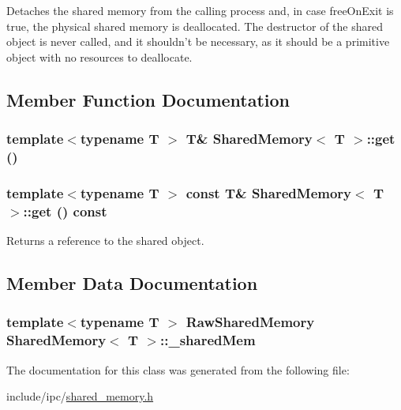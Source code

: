 Detaches the shared memory from the calling process and, in case freeOnExit is true, the physical shared memory is deallocated. The destructor of the shared object is never called, and it shouldn't be necessary, as it should be a primitive object with no resources to deallocate. 

\subsection{Member Function Documentation}
\hypertarget{classSharedMemory_9e6dc18f48d48d7a2b3513426b2c294b}{
\subsubsection[{get}]{\setlength{\rightskip}{0pt plus 5cm}template$<$typename T $>$ T\& {\bf SharedMemory}$<$ T $>$::get ()}}
\label{classSharedMemory_9e6dc18f48d48d7a2b3513426b2c294b}


\hypertarget{classSharedMemory_fa3899dfa26d650bbb3937c1339460f6}{
\subsubsection[{get}]{\setlength{\rightskip}{0pt plus 5cm}template$<$typename T $>$ const T\& {\bf SharedMemory}$<$ T $>$::get () const}}
\label{classSharedMemory_fa3899dfa26d650bbb3937c1339460f6}


Returns a reference to the shared object. 

\subsection{Member Data Documentation}
\hypertarget{classSharedMemory_b836723ac7b0afaaf43c2bcc1b59c0d1}{
\subsubsection[{\_\-sharedMem}]{\setlength{\rightskip}{0pt plus 5cm}template$<$typename T $>$ {\bf RawSharedMemory} {\bf SharedMemory}$<$ T $>$::{\bf \_\-sharedMem}}}
\label{classSharedMemory_b836723ac7b0afaaf43c2bcc1b59c0d1}




The documentation for this class was generated from the following file:\begin{CompactItemize}
\item 
include/ipc/\hyperlink{shared__memory_8h}{shared\_\-memory.h}\end{CompactItemize}

